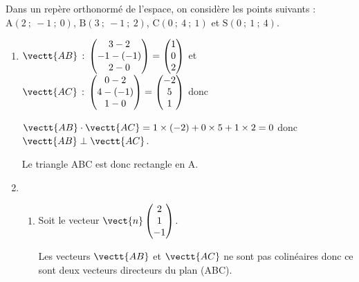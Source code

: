 
\medskip

Dans un repère orthonormé de l'espace, on considère les points suivants : \hfill{}$\text{A}(2~;~-1~;~0)$, $\text{B}(3~;~-1~;~2)$, $\text{C}(0~;~4~;~1)$ et $\text{S} (0~;~1~;~4)$.\hfill{}

\smallskip

\begin{enumerate}
\item %
$\vectt{AB}\,:\,
\begin{pmatrix}
3-2 \\-1-(-1)\\2-0
\end{pmatrix}
=
\begin{pmatrix}
1\\0\\2
\end{pmatrix}$
et
$\vectt{AC}\,:\,
\begin{pmatrix}
0-2 \\4-(-1)\\1-0
\end{pmatrix}
=
\begin{pmatrix}
-2 \\5\\1
\end{pmatrix}
$
donc

$\vectt{AB}\cdot \vectt{AC} = 1\times (-2) + 0\times 5 + 1 \times 2 = 0$
donc
$\vectt{AB}\perp \vectt{AC}$.

Le triangle ABC est donc rectangle en A.

\item  
	\begin{enumerate}
		\item Soit le vecteur $\vect{n}\begin{pmatrix}2\\1\\- 1\end{pmatrix}$.

Les vecteurs $\vectt{AB}$ et $\vectt{AC}$ ne sont pas colinéaires donc ce sont deux vecteurs directeurs du plan (ABC).
		
		

\end{enumerate}
\end{enumerate}
